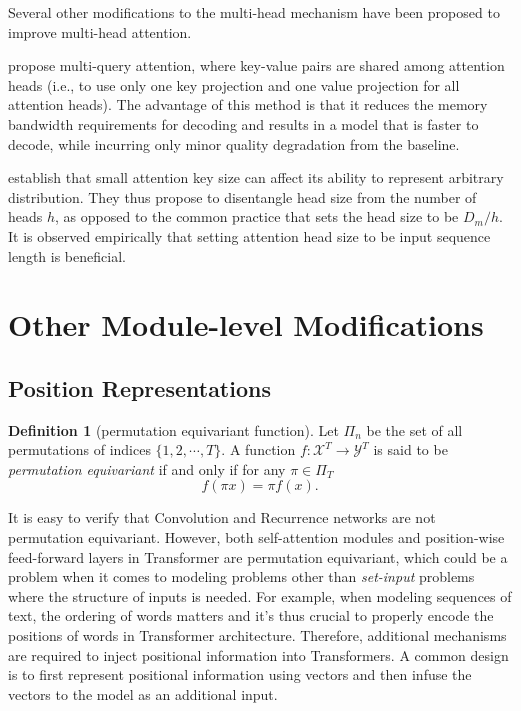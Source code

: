 \documentclass[manuscript,acmsmall,screen,nonacm]{acmart}
\theoremstyle{definition}
\newtheorem{definition}{Definition}[section]
\begin{document}
Several other modifications to the multi-head mechanism have been proposed to improve multi-head attention.

\citet{shazeer19multiquery} propose multi-query attention, where key-value pairs are shared among attention heads (i.e., to use only one key projection and one value projection for all attention heads). The advantage of this method is that it reduces the memory bandwidth requirements for decoding and results in a model that is faster to decode, while incurring only minor quality degradation from the baseline.

\citet{bhoj20lowrankbottleneck} establish that small attention key size can affect its ability to represent arbitrary distribution. They thus propose to disentangle head size from the number of heads $h$, as opposed to the common practice that sets the head size to be $D_m/h$. It is observed empirically that setting attention head size to be input sequence length is beneficial.

\section{Other Module-level Modifications}\label{sec:other_module}
\subsection{Position Representations}\label{sec:pos_rep}
\begin{definition}[permutation equivariant function]
Let $\Pi_n$ be the set of all permutations of indices $\{1,2,\cdots, T\}$. A function $f:\mathcal{X}^T\rightarrow \mathcal{Y}^T$ is said to be \textit{permutation equivariant} if and only if for any $\pi\in\Pi_T$
\begin{equation}
    f(\pi x)=\pi f(x).
\end{equation}
\end{definition}

It is easy to verify that Convolution and Recurrence networks are not permutation equivariant. However, both self-attention modules and position-wise feed-forward layers in Transformer are permutation equivariant, which could be a problem when it comes to modeling problems other than \textit{set-input} problems where the structure of inputs is needed. For example, when modeling sequences of text, the ordering of words matters and it's thus crucial to properly encode the positions of words in Transformer architecture. Therefore, additional mechanisms are required to inject positional information into Transformers. A common design is to first represent positional information using vectors and then infuse the vectors to the model as an additional input.
\end{document}
